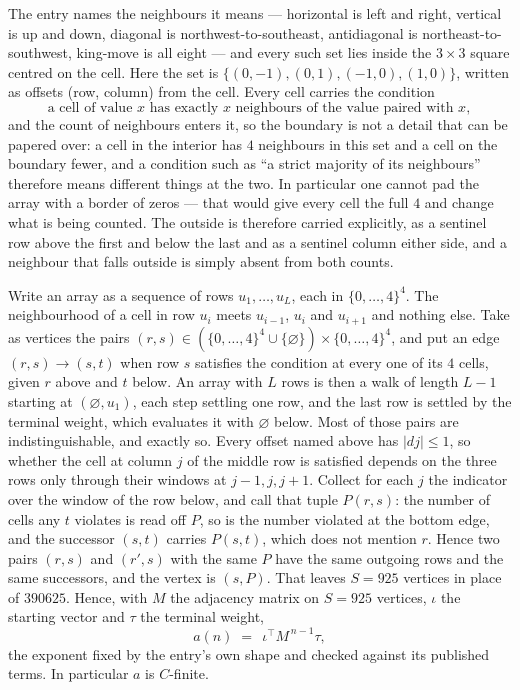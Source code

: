 \documentclass[11pt,a4paper]{article}
\theoremstyle{plain}
\theoremstyle{definition}
\begin{document}
The entry names the neighbours it means --- horizontal is left and right, vertical is up and
down, diagonal is northwest-to-southeast, antidiagonal is northeast-to-southwest, king-move is
all eight --- and every such set lies inside the $3\times3$ square centred on the cell. Here
the set is $\{(0,-1), (0,1), (-1,0), (1,0)\}$, written as offsets (row, column) from the cell. Every cell carries
the condition
\[
\text{a cell of value }x\text{ has exactly }x\text{ neighbours of the value paired with }x,
\]
and the count of neighbours enters it, so the boundary is not a detail that can be papered
over: a cell in the interior has $4$ neighbours in this set and a cell on the boundary
fewer, and a condition such as ``a strict majority of its neighbours'' therefore means
different things at the two. In particular one cannot pad the array with a border of zeros ---
that would give every cell the full $4$ and change what is being counted. The outside is
therefore carried
explicitly, as a sentinel row above the first and below the last and as a sentinel column
either side, and a neighbour that falls outside is simply absent from both counts.

Write an array as a sequence of rows $u_1,\dots,u_L$, each in
$\{0,\dots,4\}^{4}$. The neighbourhood of a cell in row $u_i$ meets $u_{i-1}$,
$u_i$ and $u_{i+1}$ and nothing else. Take as vertices the pairs
$(r,s)\in(\{0,\dots,4\}^{4}\cup\{\varnothing\})\times\{0,\dots,4\}^{4}$,
and put an edge $(r,s)\to(s,t)$ when row $s$ satisfies the condition at every one of its
$4$ cells, given $r$ above and $t$ below. An array with $L$ rows is then a walk of length
$L-1$ starting at $(\varnothing,u_1)$, each step settling one row, and the last row is
settled by the terminal weight, which evaluates it with $\varnothing$ below. Most of those pairs are indistinguishable, and exactly so. Every offset named above has $|dj|\le 1$, so whether the cell at column $j$ of the middle row is satisfied depends on the three rows only through their windows at $j-1,j,j+1$. Collect for each $j$ the indicator over the window of the row below, and call that tuple $P(r,s)$: the number of cells any $t$ violates is read off $P$, so is the number violated at the bottom edge, and the successor $(s,t)$ carries $P(s,t)$, which does not mention $r$. Hence two pairs $(r,s)$ and $(r',s)$ with the same $P$ have the same outgoing rows and the same successors, and the vertex is $(s,P)$. That leaves $S=925$ vertices in place of $390625$. Hence,
with $M$ the adjacency matrix on $S=925$ vertices, $\iota$ the starting vector and $\tau$ the
terminal weight,
\[
a(n)\;=\;\,\iota^{\!\top}M^{\,n-1}\tau ,
\]
the exponent fixed by the entry's own shape and checked against its published terms. In
particular $a$ is $C$-finite.
\end{document}
